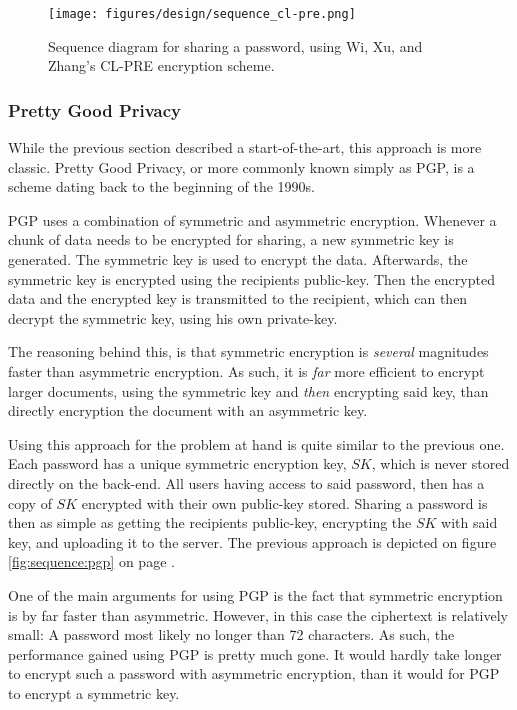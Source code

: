 				\begin{figure}[h!]
					\centering
					\texttt{[image: figures/design/sequence\_cl-pre.png]}
					\caption{Sequence diagram for sharing a password, using Wi, Xu, and Zhang's CL-PRE encryption scheme.}
					\label{fig:sequence:cl-pre}
				\end{figure}

			\subsubsection{Pretty Good Privacy}
				While the previous section described a start-of-the-art, this approach is more classic. Pretty Good Privacy, or more commonly known simply as PGP, is a scheme dating back to the beginning of the 1990s. 

				PGP uses a combination of symmetric and asymmetric encryption. Whenever a chunk of data needs to be encrypted for sharing, a new symmetric key is generated. The symmetric key is used to encrypt the data. Afterwards, the symmetric key is encrypted using the recipients public-key. Then the encrypted data and the encrypted key is transmitted to the recipient, which can then decrypt the symmetric key, using his own private-key. 

				The reasoning behind this, is that symmetric encryption is \emph{several} magnitudes faster than asymmetric encryption. As such, it is \emph{far} more efficient to encrypt larger documents, using the symmetric key and \emph{then} encrypting said key, than directly encryption the document with an asymmetric key.

				Using this approach for the problem at hand is quite similar to the previous one. Each password has a unique symmetric encryption key, $SK$, which is never stored directly on the back-end. All users having access to said password, then has a copy of $SK$ encrypted with their own public-key stored. Sharing a password is then as simple as getting the recipients public-key, encrypting the $SK$ with said key, and uploading it to the server. The previous approach is depicted on figure \ref{fig:sequence:pgp} on page \pageref{fig:sequence:pgp}.

				One of the main arguments for using PGP is the fact that symmetric encryption is by far faster than asymmetric. However, in this case the ciphertext is relatively small: A password most likely no longer than 72 characters. As such, the performance gained using PGP is pretty much gone. It would hardly take longer to encrypt such a password with asymmetric encryption, than it would for PGP to encrypt a symmetric key.

